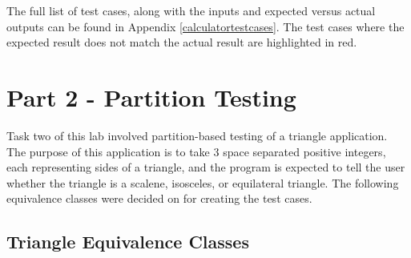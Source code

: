 \documentclass[letterpaper]{article}
\begin{document}
The full list of test cases, along with the inputs and expected versus actual outputs can be found in Appendix \ref{calculatortestcases}.
The test cases where the expected result does not match the actual result are highlighted in red.



\section*{Part 2 - Partition Testing}
Task two of this lab involved partition-based testing of a triangle application.
The purpose of this application is to take 3 space separated positive integers,
each representing sides of a triangle, and the program is expected to tell the
user whether the triangle is a scalene, isosceles, or equilateral triangle.
The following equivalence classes were decided on for creating the test cases.
\subsection*{Triangle Equivalence Classes}


\end{document}
